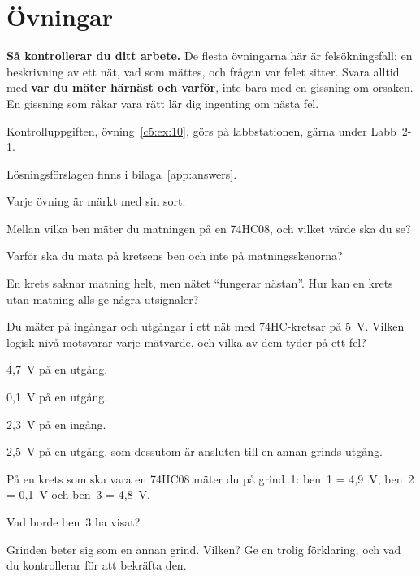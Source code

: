 %

\section{Övningar}
\label{c5:sec:exercises}\label{c5:app:b}

\begin{aside}
\textbf{Så kontrollerar du ditt arbete.} De flesta övningarna här är felsökningsfall: en
beskrivning av ett nät, vad som mättes, och frågan var felet sitter. Svara alltid med \textbf{var du
mäter härnäst och varför}, inte bara med en gissning om orsaken. En gissning som råkar vara rätt
lär dig ingenting om nästa fel.

Kontrolluppgiften, övning~\ref{c5:ex:10}, görs på labbstationen, gärna under Labb~2-1.

Lösningsförslagen finns i bilaga~\ref{app:answers}.

Varje övning är märkt med sin sort.
\end{aside}

\label{c5:ex:1}
\begin{parts}
  \item Mellan vilka ben mäter du matningen på en 74HC08, och vilket värde ska du se?
  \item Varför ska du mäta på kretsens ben och inte på matningsskenorna?
  \item En krets saknar matning helt, men nätet \enquote{fungerar nästan}. Hur kan en krets utan
    matning alls ge några utsignaler?
\end{parts}

\label{c5:ex:2}
Du mäter på ingångar och utgångar i ett nät med 74HC-kretsar på 5~V. Vilken logisk nivå motsvarar
varje mätvärde, och vilka av dem tyder på ett fel?
\begin{parts}
  \item 4,7~V på en utgång.
  \item 0,1~V på en utgång.
  \item 2,3~V på en ingång.
  \item 2,5~V på en utgång, som dessutom är ansluten till en annan grinds utgång.
\end{parts}

\label{c5:ex:3}
På en krets som ska vara en 74HC08 mäter du på grind~1: ben~1 = 4,9~V, ben~2 = 0,1~V och ben~3 =
4,8~V.
\begin{parts}
  \item Vad borde ben~3 ha visat?
  \item Grinden beter sig som en annan grind. Vilken? Ge en trolig förklaring, och vad du
    kontrollerar för att bekräfta den.
\end{parts}

